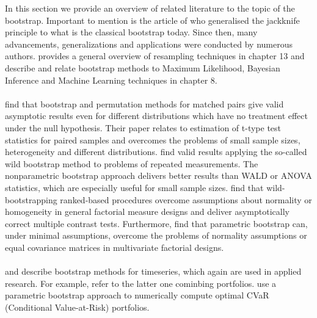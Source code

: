 In this section we provide an overview of related literature to the topic of the bootstrap. Important to mention is the article of \citet{boot1} who generalised the jackknife principle to what is the classical bootstrap today. Since then, many advancements, generalizations and applications were conducted by numerous authors. \citet{prob1} provides a general overview of resampling techniques in chapter 13 and \citet{stat1} describe and relate bootstrap methods to Maximum Likelihood, Bayesian Inference and Machine Learning techniques in chapter 8. \\
\\
\noindent \citet{boot4} find that bootstrap and permutation methods for matched pairs give valid asymptotic results even for different distributions which have no treatment effect under the null hypothesis. Their paper relates to estimation of t-type test statistics for paired samples and overcomes the problems of small sample sizes, heterogeneity and different distributions. \citet{boot2} find valid results applying the so-called wild bootstrap method to problems of repeated measurements. The nonparametric bootstrap approach delivers better results than WALD or ANOVA statistics, which are especially useful for small sample sizes. \citet{boot3} find that wild-bootstrapping ranked-based procedures overcome assumptions about normality or homogeneity in general factorial measure designs and deliver asymptotically correct multiple contrast tests. Furthermore, \citet{boot5} find that parametric bootstrap can, under minimal assumptions, overcome the problems of normality assumptions or equal covariance matrices in multivariate factorial designs. \\
\\
\noindent \citet{boot6} and \citet{boot7} describe bootstrap methods for timeseries, which again are used in applied research. For example, \citet{alla} refer to the latter one cominbing portfolios. \citet{erin} use a parametric bootstrap approach to numerically compute optimal CVaR (Conditional Value-at-Risk) portfolios.

